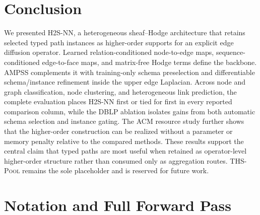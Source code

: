 \documentclass{article}
\newcommand{\method}{\textsc{H2S-NN}}
\newcommand{\ampss}{\textsc{AMPSS}}
\newcommand{\thspool}{\textsc{THS-Pool}}
\begin{document}
\section{Conclusion}

We presented \method, a heterogeneous sheaf--Hodge architecture that retains selected typed path
instances as higher-order supports for an explicit edge diffusion operator. Learned
relation-conditioned node-to-edge maps, sequence-conditioned edge-to-face maps, and matrix-free
Hodge terms define the backbone. \ampss{} complements it with training-only schema preselection
and differentiable schema/instance refinement inside the upper edge Laplacian. Across node and
graph classification, node clustering, and heterogeneous link prediction, the complete evaluation
places \method{} first or tied for first in every reported comparison column, while the DBLP
ablation isolates gains from both automatic schema selection and instance gating. The ACM resource
study further shows that the higher-order construction can be realized without a parameter or
memory penalty relative to the compared methods. These results support the central claim that typed
paths are most useful when retained as operator-level higher-order structure rather than consumed
only as aggregation routes. \thspool{} remains the sole placeholder and is reserved for future work.




\appendix

\section{Notation and Full Forward Pass}
\label{app:notation}
\end{document}
